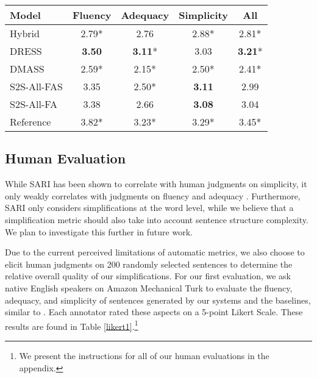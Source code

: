 \documentclass[11pt,a4paper]{article}
\begin{document}
\begin{table*}
\begin{center}
\begin{tabular}{|l|cccc|}
\hline
\textbf{Model} & \textbf{Fluency} & \textbf{Adequacy} & \textbf{Simplicity} & \textbf{All} \\ \hline
Hybrid & 2.79* & 2.76 & 2.88* & 2.81* \\
DRESS & \textbf{3.50} & \textbf{3.11}* & 3.03 & \textbf{3.21}* \\ 
DMASS & 2.59* & 2.15* & 2.50* & 2.41* \\ \hline
S2S-All-FAS & 3.35 & 2.50* & \textbf{3.11} & 2.99 \\
S2S-All-FA & 3.38 & 2.66 & \textbf{3.08} & 3.04 \\ \hline
Reference & 3.82* & 3.23* & 3.29* & 3.45* \\ \hline
\end{tabular}
\end{center}
\caption{\label{likert1} Average ratings of crowdsourced human judgments on fluency, adequacy and complexity. Ratings significantly different from S2S-All-FA are marked with * ($p < 0.05$); statistical significance tests were calculated using a student t-test. We provide 95\% confidence intervals for each rating in the appendix.}
\end{table*}

\subsection{Human Evaluation}

While SARI has been shown to correlate with human judgments on simplicity, it only weakly correlates with judgments on fluency and adequacy \cite{xu2016optimizing}. Furthermore, SARI only considers simplifications at the word level, while we believe that a simplification metric should also take into account sentence structure complexity. We plan to investigate this further in future work.

Due to the current perceived limitations of automatic metrics, we also choose to elicit human judgments on 200 randomly selected sentences to determine the relative overall quality of our simplifications. For our first evaluation, we ask native English speakers on Amazon Mechanical Turk to evaluate the fluency, adequacy, and simplicity of sentences generated by our systems and the baselines, similar to . Each annotator rated these aspects on a 5-point Likert Scale. These results are found in Table \ref{likert1}.\footnote{We present the instructions for all of our human evaluations in the appendix.}
\end{document}
